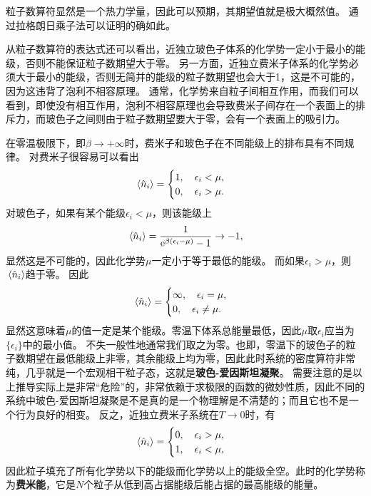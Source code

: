 \documentclass[hyperref, UTF8, a4paper]{ctexart}
\newcommand*{\ee}{\mathrm{e}}
\begin{document}
粒子数算符显然是一个热力学量，因此可以预期，其期望值就是极大概然值。
通过拉格朗日乘子法可以证明的确如此。

从粒子数算符的表达式还可以看出，近独立玻色子体系的化学势一定小于最小的能级，否则不能保证粒子数期望大于零。
另一方面，近独立费米子体系的化学势必须大于最小的能级，否则无简并的能级的粒子数期望也会大于1，这是不可能的，因为这违背了泡利不相容原理。
通常，化学势来自粒子间相互作用，而我们可以看到，即使没有相互作用，泡利不相容原理也会导致费米子间存在一个表面上的排斥力，而玻色子之间则由于粒子数期望要大于零，会有一个表面上的吸引力。

在零温极限下，即$\beta \to + \infty$时，费米子和玻色子在不同能级上的排布具有不同规律。
对费米子很容易可以看出
\begin{equation}
    \expval*{\hat{n}_i} = \begin{cases}
        1, \quad \epsilon_i < \mu, \\
        0, \quad \epsilon_i > \mu.
    \end{cases}
\end{equation}
对玻色子，如果有某个能级$\epsilon_i < \mu$，则该能级上
\[
    \expval*{\hat{n}_i} = \frac{1}{\ee^{  \beta (\epsilon_i - \mu)} - 1} \to -1,
\]
显然这是不可能的，因此化学势$\mu$一定小于等于最低的能级。
而如果$\epsilon_i > \mu$，则$\expval*{\hat{n}_i}$趋于零。
因此
\[
    \expval*{\hat{n}_i} = \begin{cases}
        \infty, \quad \epsilon_i = \mu, \\
        0, \quad \epsilon_i \neq \mu.
    \end{cases}
\]
显然这意味着$\mu$的值一定是某个能级。零温下体系总能量最低，因此$\mu$取$\epsilon_i$应当为$\{\epsilon_i\}$中的最小值。
不失一般性地通常我们取之为零。也即，零温下的玻色子的粒子数期望在最低能级上非零，其余能级上均为零，因此此时系统的密度算符非常纯，几乎就是一个宏观相干粒子态，这就是\textbf{玻色-爱因斯坦凝聚}。
需要注意的是以上推导实际上是非常“危险”的，非常依赖于求极限的函数的微妙性质，因此不同的系统中玻色-爱因斯坦凝聚是不是真的是一个物理解是不清楚的；而且它也不是一个行为良好的相变。
反之，近独立费米子系统在$T\to 0$时，有
\[
    \expval*{\hat{n}_i} = \begin{cases}
        0, \quad \epsilon_i > \mu, \\
        1, \quad \epsilon_i < \mu, 
    \end{cases}
\]
因此粒子填充了所有化学势以下的能级而化学势以上的能级全空。此时的化学势称为\textbf{费米能}，它是$N$个粒子从低到高占据能级后能占据的最高能级的能量。
\end{document}
